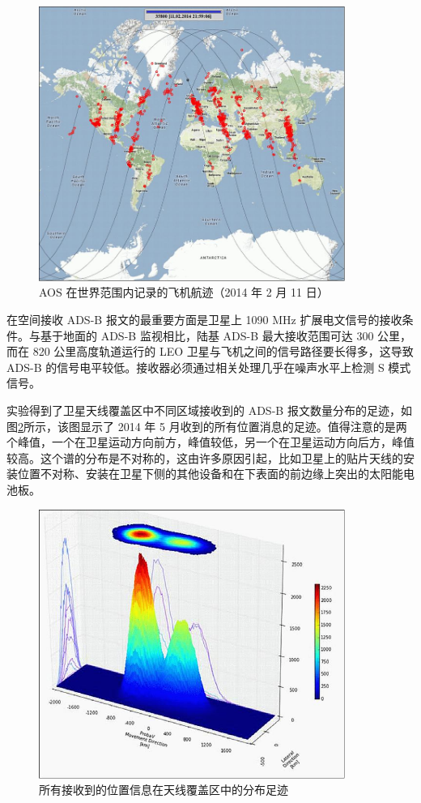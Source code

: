 \begin{figure}[!htb]
\centering
\includegraphics[width=10cm]{pic/ADS-B_Auto6.jpeg}
\caption{AOS 在世界范围内记录的飞机航迹（2014 年 2 月 11 日）\protect\footnotemark}
\label{fig:ADS-B_Auto6}
\end{figure}


在空间接收 ADS-B 报文的最重要方面是卫星上 1090 MHz 扩展电文信号的接收条件。与基于地面的 ADS-B 监视相比，陆基 ADS-B 最大接收范围可达 300 公里，而在 820 公里高度轨道运行的 LEO 卫星与飞机之间的信号路径要长得多，这导致 ADS-B 的信号电平较低。接收器必须通过相关处理几乎在噪声水平上检测 S 模式信号。

实验得到了卫星天线覆盖区中不同区域接收到的 ADS-B 报文数量分布的足迹，如图\ref{fig:ADS-B_Auto5}所示，该图显示了 2014 年 5 月收到的所有位置消息的足迹。值得注意的是两个峰值，一个在卫星运动方向前方，峰值较低，另一个在卫星运动方向后方，峰值较高。这个谱的分布是不对称的，这由许多原因引起，比如卫星上的贴片天线的安装位置不对称、安装在卫星下侧的其他设备和在下表面的前边缘上突出的太阳能电池板。

\begin{figure}[!htb]
\centering
\includegraphics[width=10cm]{pic/ADS-B_Auto5.jpeg}
\caption{所有接收到的位置信息在天线覆盖区中的分布足迹\protect\footnotemark}
\label{fig:ADS-B_Auto5}
\end{figure}

